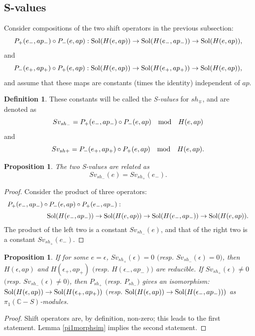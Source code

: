 \documentclass[a4paper,12pt]{article}
\newtheorem{prp}[thm]{Proposition}
\theoremstyle{definition}
\newtheorem{dfn}[thm]{Definition}
\theoremstyle{remark}
\numberwithin{equation}{section} %
\begin{document}
\subsection{S-values}\label{GenShiftS}
Consider  compositions of the two  shift operators in the previous subsection:
$$P_+(e_-,ap_-)\circ P_-(e,ap):{\rm Sol}(H(e,ap))\to {\rm Sol}(H(e_-,ap_-))\to {\rm Sol}(H(e,ap)),$$
and
$$P_-(e_+,ap_+)\circ P_+(e,ap):{\rm Sol}(H(e,ap))\to {\rm Sol}(H(e_+,ap_+))\to {\rm Sol}(H(e,ap)),$$
and assume that these maps are constants (times the identity)  independent of $ap$.
\begin{dfn}These constants will be called the {\it S-values} for $sh_\mp$, and are denoted as 
$$Sv_{sh_-}=P_+(e_-,ap_-)\circ P_-(e,ap) {\rm\quad mod\quad} H(e,ap)$$
and
$$Sv_{sh+}=P_-(e_+,ap_+)\circ P_+(e,ap) {\rm\quad mod\quad} H(e,ap).$$
\end{dfn}
\begin{prp}\label{twoSvalues} The two S-values are related as
  $$Sv_{sh_-}(e)=Sv_{sh_+}(e_-).$$
\end{prp}
\begin{proof}  
Consider the product of three operators:
\[ \begin{array}{l}  
  P_{+}(e_-,ap_-)\circ P_{-}(e,ap)\circ P_{+}(e_-,ap_-) : \\[2mm]
 \hskip60pt
{\rm Sol}(H(e_-,ap_-)) \to {\rm Sol}(H(e,ap))\to {\rm Sol}(H(e_-,ap_-)) \to {\rm Sol}(H(e,ap)).
\end{array}\]
The product of the left two is a constant $Sv_{sh_-}(e)$,
and that of the right two is a constant $Sv_{sh_+}(e_-)$.
\end{proof} %

\begin{prp}\label{Sred}   
If for some $e=\epsilon$, $Sv_{sh_+}(\epsilon)=0$ $($resp. $Sv_{sh_-}(\epsilon)=0)$, then $H(\epsilon,ap)$ and $H(\epsilon_+,ap_+)$ $($resp. $H(\epsilon_-,ap_-))$ are reducible. If  $Sv_{sh_+}(\epsilon)\not=0$ $($resp. $Sv_{sh_-}(\epsilon)\not=0)$, then $P_{sh_+}$ $($resp. $P_{sh_-})$ gives an isomorphism: ${\rm Sol}(H(\epsilon,ap))\to {\rm Sol}(H(\epsilon_+,ap_+))$ $($resp. ${\rm Sol}(H(\epsilon,ap))\to {\rm Sol}(H(\epsilon_-,ap_-)))$ as $\pi_1(\mathbb{C}-S)$-modules.
\end{prp}
\begin{proof} %
  Shift operators are, by definition, non-zero; this leads to the first statement. Lemma \ref{pi1morphsim}  implies the second statement.
  \end{proof} %
\end{document}
